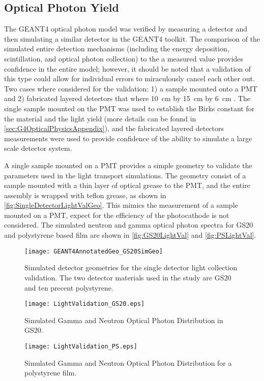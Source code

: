 \subsection{Optical Photon Yield}
\label{sec:OpticalPhotonValidation}
The GEANT4 optical photon model was verified by measuring a detector and then simulating a similar detector in the GEANT4 toolkit. 
The comparison of the simulated entire  detection mechanisms (including the energy deposition, scintillation, and optical photon collection) to the a measured value provides confidence in the entire model; however, it should be noted that a validation of this type could allow for individual errors to miraculously cancel each other out.
Two cases where considered for the validation: 1) a sample mounted onto a PMT and 2) fabricated layered detectors that where  \SI{10}{cm} by \SI{15}{cm} by \SI{6}{cm} .
The single sample mounted on the PMT was used to establish the Birks constant for the material and the light yield (more details can be found in \autoref{sec:G4OpticalPhysicsAppendix}), and the fabricated layered detectors measurements were used to provide confidence of the ability to simulate a large scale detector system.

A single sample mounted on a PMT provides a simple geometry to validate the parameters used in the light transport simulations. 
The geometry consist of a sample mounted with a thin layer of optical grease to the PMT, and the entire assembly is wrapped with teflon grease, as shown in \autoref{fig:SingleDetectorLightValGeo}.
This mimics the measurement of a sample mounted on a PMT, expect for the efficiency of the photocathode is not considered.
The simulated neutron and gamma optical photon spectra for GS20 and polystyrene based film are shown in \autoref{fig:GS20LightVal} and \autoref{fig:PSLightVal}.
\begin{figure}
	\centering
	\texttt{[image: GEANT4AnnotatedGeo\_GS20SimGeo]}
	\caption[Simulated Detector Geoemtry for Single Detectors]{Simulated detector geometries for the single detector light collection validation. The two detector materials used in the study are GS20 and ten precent  polystyrene.}
	\label{fig:SingleDetectorLightValGeo}
\end{figure}
\begin{figure}
	\centering
	\texttt{[image: LightValidation\_GS20.eps]}
	\caption{Simulated Gamma and Neutron Optical Photon Distribution in GS20. \LightYieldEDepSimGeo}
	\label{fig:GS20LightVal}
\end{figure}
\begin{figure}
	\centering
	\texttt{[image: LightValidation\_PS.eps]}
	\caption{Simulated Gamma and Neutron Optical Photon Distribution for a polystyrene film. \LightYieldEDepSimGeo}
	\label{fig:PSLightVal}
\end{figure}

